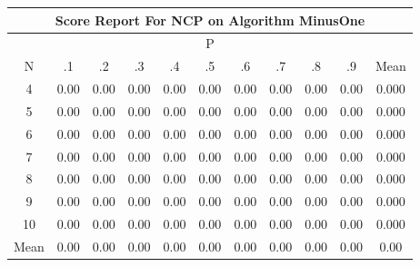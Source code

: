 \documentclass[11pt,a4paper]{report}
\begin{document}
\begin{longtable}{ | c || c | c | c | c | c | c | c | c | c || c |}
\hline
\multicolumn{11}{|c|}{ Score Report For NCP on Algorithm MinusOne} \\
\hline
\multicolumn{11}{|c|}{ P } \\
\hline
N & .1 & .2 & .3 & .4 & .5 & .6 & .7 & .8 & .9 & Mean\\
 \hline
 \hline
 \endhead
  4 &  \cellcolor[HTML]{FFFFFF} 0.00 &  \cellcolor[HTML]{FFFFFF} 0.00 &  \cellcolor[HTML]{FFFFFF} 0.00 &  \cellcolor[HTML]{FFFFFF} 0.00 &  \cellcolor[HTML]{FFFFFF} 0.00 &  \cellcolor[HTML]{FFFFFF} 0.00 &  \cellcolor[HTML]{FFFFFF} 0.00 &  \cellcolor[HTML]{FFFFFF} 0.00 &  \cellcolor[HTML]{FFFFFF} 0.00 & 0.000 \\
  5 &  \cellcolor[HTML]{FFFFFF} 0.00 &  \cellcolor[HTML]{FFFFFF} 0.00 &  \cellcolor[HTML]{FFFFFF} 0.00 &  \cellcolor[HTML]{FFFFFF} 0.00 &  \cellcolor[HTML]{FFFFFF} 0.00 &  \cellcolor[HTML]{FFFFFF} 0.00 &  \cellcolor[HTML]{FFFFFF} 0.00 &  \cellcolor[HTML]{FFFFFF} 0.00 &  \cellcolor[HTML]{FFFFFF} 0.00 & 0.000 \\
  6 &  \cellcolor[HTML]{FFFFFF} 0.00 &  \cellcolor[HTML]{FFFFFF} 0.00 &  \cellcolor[HTML]{FFFFFF} 0.00 &  \cellcolor[HTML]{FFFFFF} 0.00 &  \cellcolor[HTML]{FFFFFF} 0.00 &  \cellcolor[HTML]{FFFFFF} 0.00 &  \cellcolor[HTML]{FFFFFF} 0.00 &  \cellcolor[HTML]{FFFFFF} 0.00 &  \cellcolor[HTML]{FFFFFF} 0.00 & 0.000 \\
  7 &  \cellcolor[HTML]{FFFFFF} 0.00 &  \cellcolor[HTML]{FFFFFF} 0.00 &  \cellcolor[HTML]{FFFFFF} 0.00 &  \cellcolor[HTML]{FFFFFF} 0.00 &  \cellcolor[HTML]{FFFFFF} 0.00 &  \cellcolor[HTML]{FFFFFF} 0.00 &  \cellcolor[HTML]{FFFFFF} 0.00 &  \cellcolor[HTML]{FFFFFF} 0.00 &  \cellcolor[HTML]{FFFFFF} 0.00 & 0.000 \\
  8 &  \cellcolor[HTML]{FFFFFF} 0.00 &  \cellcolor[HTML]{FFFFFF} 0.00 &  \cellcolor[HTML]{FFFFFF} 0.00 &  \cellcolor[HTML]{FFFFFF} 0.00 &  \cellcolor[HTML]{FFFFFF} 0.00 &  \cellcolor[HTML]{FFFFFF} 0.00 &  \cellcolor[HTML]{FFFFFF} 0.00 &  \cellcolor[HTML]{FFFFFF} 0.00 &  \cellcolor[HTML]{FFFFFF} 0.00 & 0.000 \\
  9 &  \cellcolor[HTML]{FFFFFF} 0.00 &  \cellcolor[HTML]{FFFFFF} 0.00 &  \cellcolor[HTML]{FFFFFF} 0.00 &  \cellcolor[HTML]{FFFFFF} 0.00 &  \cellcolor[HTML]{FFFFFF} 0.00 &  \cellcolor[HTML]{FFFFFF} 0.00 &  \cellcolor[HTML]{FFFFFF} 0.00 &  \cellcolor[HTML]{FFFFFF} 0.00 &  \cellcolor[HTML]{FFFFFF} 0.00 & 0.000 \\
  10 &  \cellcolor[HTML]{FFFFFF} 0.00 &  \cellcolor[HTML]{FFFFFF} 0.00 &  \cellcolor[HTML]{FFFFFF} 0.00 &  \cellcolor[HTML]{FFFFFF} 0.00 &  \cellcolor[HTML]{FFFFFF} 0.00 &  \cellcolor[HTML]{FFFFFF} 0.00 &  \cellcolor[HTML]{FFFFFF} 0.00 &  \cellcolor[HTML]{FFFFFF} 0.00 &  \cellcolor[HTML]{FFFFFF} 0.00 & 0.000 \\
 \hline
 \hline
Mean &  \cellcolor[HTML]{FFFFFF} 0.00 &  \cellcolor[HTML]{FFFFFF} 0.00 &  \cellcolor[HTML]{FFFFFF} 0.00 &  \cellcolor[HTML]{FFFFFF} 0.00 &  \cellcolor[HTML]{FFFFFF} 0.00 &  \cellcolor[HTML]{FFFFFF} 0.00 &  \cellcolor[HTML]{FFFFFF} 0.00 &  \cellcolor[HTML]{FFFFFF} 0.00 &  \cellcolor[HTML]{FFFFFF} 0.00 &  \cellcolor[HTML]{FFFFFF} 0.00
\end{longtable}
\end{document}
